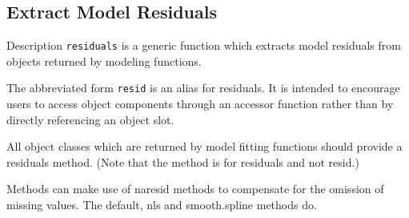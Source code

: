 \documentclass[residuals.tex]{subfiles}
\begin{document}
	
\newpage
\subsection{Extract Model Residuals}


Description
\texttt{residuals} is a generic function which extracts model residuals from objects returned by modeling functions. 

The abbreviated form \texttt{resid} is an alias for residuals. It is intended to encourage users to access object components through an accessor function rather than by directly referencing an object slot. 

All object classes which are returned by model fitting functions should provide a residuals method. (Note that the method is for residuals and not resid.) 

Methods can make use of naresid methods to compensate for the omission of missing values. The default, nls and smooth.spline methods do. 


\begin{framed}
\begin{verbatim}

\end{verbatim}
\end{framed}
\end{document}
